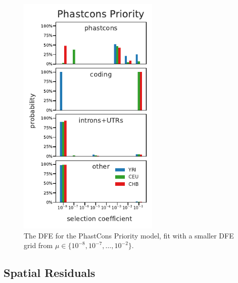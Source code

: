 \documentclass[11pt]{article}
\begin{document}
\begin{figure}[htbp]
    \label{suppfig:dfe-pop-smallgrid-phastcons}
  \centering
  \includegraphics[width=0.6\textwidth]{figures/supplementary/phastcons_priority_pop_dfe_smallselgrid.pdf}
  \caption{The DFE for the PhastCons Priority model, fit with a smaller DFE grid from 
  $\mu \in \{10^{-8}, 10^{-7}, \ldots, 10^{-2}\}$.}
\end{figure}


\subsection{Spatial Residuals}
\label{supp:spatial-residuals}
\end{document}
